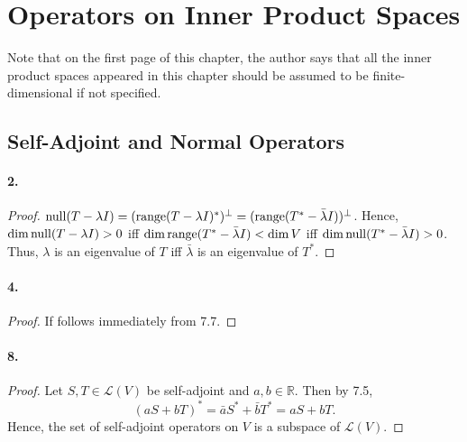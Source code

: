\section{Operators on Inner Product Spaces}
  Note that on the first page of this chapter, the author says that all the
  inner product spaces appeared in this chapter should be assumed to be 
  finite-dimensional if not specified.

\subsection{Self-Adjoint and Normal Operators}
  \paragraph{2.}
  \begin{proof}
    $\operatorname{null}(T-\lambda I) = (\operatorname{range}(T-\lambda I)^*)^\perp = (\operatorname{range}(T^*-
    \bar{\lambda}I))^\perp$. Hence, $\dim\operatorname{null}(T-\lambda I)>0$ iff $\dim\operatorname{range}(
    T^*-\bar{\lambda}I)<\dim V$ iff $\dim\operatorname{null}(T^*-\bar{\lambda}I)>0$. Thus, 
    $\lambda$ is an eigenvalue of $T$ iff $\bar{\lambda}$ is an eigenvalue of
    $T^*$.
  \end{proof}

  \paragraph{4.}
  \begin{proof}
    If follows immediately from 7.7.
  \end{proof}

  \paragraph{8.}
  \begin{proof}
    Let $S,T\in\mathcal{L}(V)$ be self-adjoint and $a,b\in\mathbb{R}$. Then
    by 7.5,
    \[
      (aS+bT)^* = \bar{a}S^*+\bar{b}T^* = aS+bT.
    \]
    Hence, the set of self-adjoint operators on $V$ is a subspace of 
    $\mathcal{L}(V)$.
  \end{proof}

